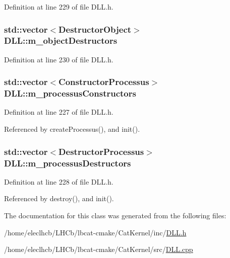 Definition at line 229 of file DLL.h.\hypertarget{classDLL_a8c34d91e0a5ccfc34fff7c66f542b2d7}{
\subsubsection[{m\_\-objectDestructors}]{\setlength{\rightskip}{0pt plus 5cm}std::vector$<${\bf DestructorObject}$>$ {\bf DLL::m\_\-objectDestructors}}}
\label{classDLL_a8c34d91e0a5ccfc34fff7c66f542b2d7}


Definition at line 230 of file DLL.h.\hypertarget{classDLL_af9b49d23b767b742e38a7286de8e7c4d}{
\subsubsection[{m\_\-processusConstructors}]{\setlength{\rightskip}{0pt plus 5cm}std::vector$<${\bf ConstructorProcessus}$>$ {\bf DLL::m\_\-processusConstructors}}}
\label{classDLL_af9b49d23b767b742e38a7286de8e7c4d}


Definition at line 227 of file DLL.h.

Referenced by createProcessus(), and init().\hypertarget{classDLL_a5a00cc3723ff34be55c621505f15fc08}{
\subsubsection[{m\_\-processusDestructors}]{\setlength{\rightskip}{0pt plus 5cm}std::vector$<${\bf DestructorProcessus}$>$ {\bf DLL::m\_\-processusDestructors}}}
\label{classDLL_a5a00cc3723ff34be55c621505f15fc08}


Definition at line 228 of file DLL.h.

Referenced by destroy(), and init().

The documentation for this class was generated from the following files:\begin{DoxyCompactItemize}
\item 
/home/eleclhcb/LHCb/lbcat-\/cmake/CatKernel/inc/\hyperlink{DLL_8h}{DLL.h}\item 
/home/eleclhcb/LHCb/lbcat-\/cmake/CatKernel/src/\hyperlink{DLL_8cpp}{DLL.cpp}\end{DoxyCompactItemize}
